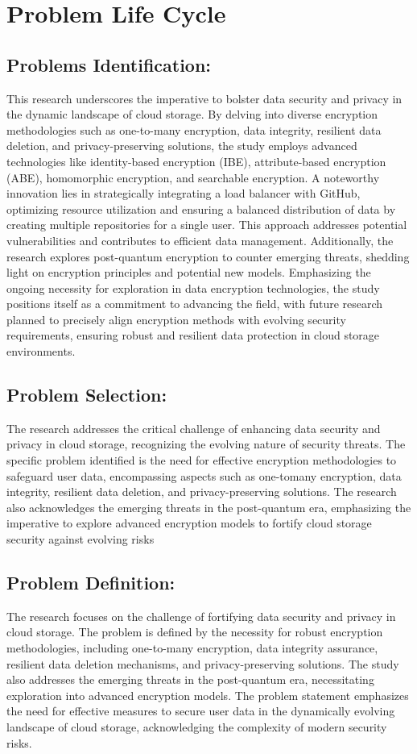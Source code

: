 \chapter{Problem Life Cycle}

\section{Problems Identification:} This research underscores the imperative to bolster data security and privacy in the dynamic
landscape of cloud storage. By delving into diverse encryption methodologies such as one-to-many
encryption, data integrity, resilient data deletion, and privacy-preserving solutions, the study
employs advanced technologies like identity-based encryption (IBE), attribute-based encryption
(ABE), homomorphic encryption, and searchable encryption. A noteworthy innovation lies in
strategically integrating a load balancer with GitHub, optimizing resource utilization and ensuring a
balanced distribution of data by creating multiple repositories for a single user. This approach
addresses potential vulnerabilities and contributes to efficient data management. Additionally, the
research explores post-quantum encryption to counter emerging threats, shedding light on
encryption principles and potential new models. Emphasizing the ongoing necessity for exploration
in data encryption technologies, the study positions itself as a commitment to advancing the field,
with future research planned to precisely align encryption methods with evolving security
requirements, ensuring robust and resilient data protection in cloud storage environments. 


\section{Problem Selection: } The research addresses the critical challenge of enhancing data security and privacy in cloud storage,
recognizing the evolving nature of security threats. The specific problem identified is the need for
effective encryption methodologies to safeguard user data, encompassing aspects such as one-tomany encryption, data integrity, resilient data deletion, and privacy-preserving solutions. The research
also acknowledges the emerging threats in the post-quantum era, emphasizing the imperative to
explore advanced encryption models to fortify cloud storage security against evolving risks

\section{Problem Definition: } The research focuses on the challenge of fortifying data security and privacy in cloud storage. The
problem is defined by the necessity for robust encryption methodologies, including one-to-many
encryption, data integrity assurance, resilient data deletion mechanisms, and privacy-preserving
solutions. The study also addresses the emerging threats in the post-quantum era, necessitating
exploration into advanced encryption models. The problem statement emphasizes the need for
effective measures to secure user data in the dynamically evolving landscape of cloud storage,
acknowledging the complexity of modern security risks. 

